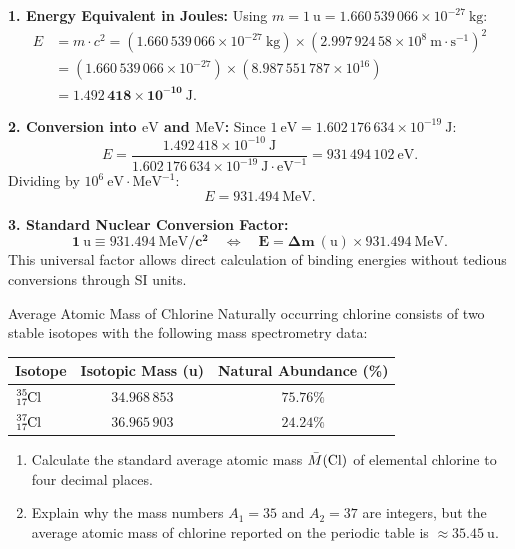 \begin{tabletworkspace}[5.0cm]
\end{tabletworkspace}

\begin{solution}
\textbf{1. Energy Equivalent in Joules:}
Using $m = 1\ \mathrm{u} = 1.660\,539\,066 \times 10^{-27}\ \mathrm{kg}$:
\begin{align*}
E &= m \cdot c^2 = (1.660\,539\,066 \times 10^{-27}\ \mathrm{kg}) \times (2.997\,924\,58 \times 10^8\ \mathrm{m\cdot s^{-1}})^2 \\
  &= (1.660\,539\,066 \times 10^{-27}) \times (8.987\,551\,787 \times 10^{16}) \\
  &= \mathbf{1.492\,418 \times 10^{-10}\ \mathrm{J}}.
\end{align*}

\textbf{2. Conversion into $\mathrm{eV}$ and $\mathrm{MeV}$:}
Since $1\ \mathrm{eV} = 1.602\,176\,634 \times 10^{-19}\ \mathrm{J}$:
\[
E = \frac{1.492\,418 \times 10^{-10}\ \mathrm{J}}{1.602\,176\,634 \times 10^{-19}\ \mathrm{J\cdot eV^{-1}}} = 931\,494\,102\ \mathrm{eV}.
\]
Dividing by $10^6\ \mathrm{eV\cdot MeV^{-1}}$:
\[
E = \mathbf{931.494\ \mathrm{MeV}}.
\]

\textbf{3. Standard Nuclear Conversion Factor:}
\[
\mathbf{1\ \mathrm{u} \equiv 931.494\ \mathrm{MeV}/c^2} \quad \iff \quad \mathbf{E = \Delta m\ (\mathrm{u}) \times 931.494\ \mathrm{MeV}}.
\]
This universal factor allows direct calculation of binding energies without tedious conversions through SI units.
\end{solution}

\begin{exercise}{Average Atomic Mass of Chlorine}
Naturally occurring chlorine consists of two stable isotopes with the following mass spectrometry data:
\begin{center}
\begin{tabular}{lcc}
\toprule
\textbf{Isotope} & \textbf{Isotopic Mass (u)} & \textbf{Natural Abundance (\%)} \\
\midrule
$\ce{^{35}_{17}Cl}$ & $34.968\,853$ & $75.76\%$ \\
$\ce{^{37}_{17}Cl}$ & $36.965\,903$ & $24.24\%$ \\
\bottomrule
\end{tabular}
\end{center}
\begin{enumerate}[leftmargin=1.5em,itemsep=2pt]
  \item Calculate the standard average atomic mass $\bar{M}(\ce{Cl})$ of elemental chlorine to four decimal places.
  \item Explain why the mass numbers $A_1 = 35$ and $A_2 = 37$ are integers, but the average atomic mass of chlorine reported on the periodic table is $\approx 35.45\ \mathrm{u}$.
\end{enumerate}
\end{exercise}

